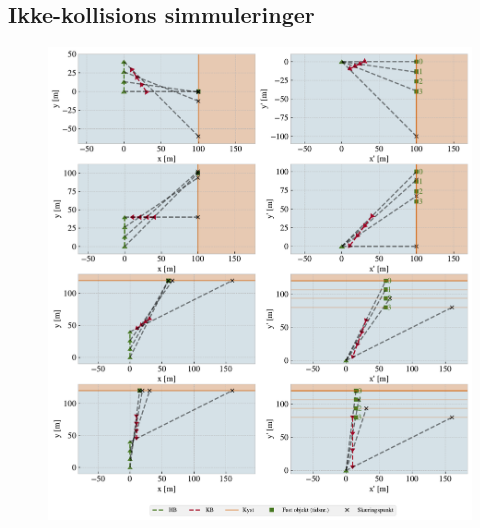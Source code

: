 \documentclass[%
 reprint,
nofootinbib,
aps,
]{revtex4-1}
\begin{document}
\clearpage
\subsection{Ikke-kollisions simmuleringer}
\begin{figure}[H]
  \includegraphics[width=\linewidth]{figures/subplot_NC1.pdf}
  \caption{}
  \label{}
\end{figure}
\end{document}
